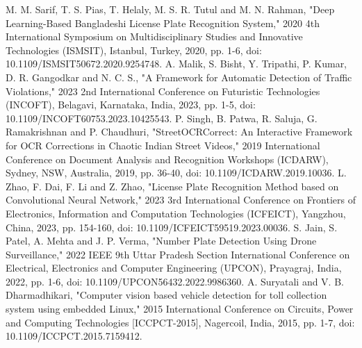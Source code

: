 \documentclass[conference]{IEEEtran}
\begin{document}
\begin{thebibliography}{00}
 M. M. Sarif, T. S. Pias, T. Helaly, M. S. R. Tutul and M. N. Rahman, "Deep Learning-Based Bangladeshi License Plate Recognition System," 2020 4th International Symposium on Multidisciplinary Studies and Innovative Technologies (ISMSIT), Istanbul, Turkey, 2020, pp. 1-6, doi: 10.1109/ISMSIT50672.2020.9254748.
 A. Malik, S. Bisht, Y. Tripathi, P. Kumar, D. R. Gangodkar and N. C. S., "A Framework for Automatic Detection of Traffic Violations," 2023 2nd International Conference on Futuristic Technologies (INCOFT), Belagavi, Karnataka, India, 2023, pp. 1-5, doi: 10.1109/INCOFT60753.2023.10425543.
 P. Singh, B. Patwa, R. Saluja, G. Ramakrishnan and P. Chaudhuri, "StreetOCRCorrect: An Interactive Framework for OCR Corrections in Chaotic Indian Street Videos," 2019 International Conference on Document Analysis and Recognition Workshops (ICDARW), Sydney, NSW, Australia, 2019, pp. 36-40, doi: 10.1109/ICDARW.2019.10036.
 L. Zhao, F. Dai, F. Li and Z. Zhao, "License Plate Recognition Method based on Convolutional Neural Network," 2023 3rd International Conference on Frontiers of Electronics, Information and Computation Technologies (ICFEICT), Yangzhou, China, 2023, pp. 154-160, doi: 10.1109/ICFEICT59519.2023.00036.
 S. Jain, S. Patel, A. Mehta and J. P. Verma, "Number Plate Detection Using Drone Surveillance," 2022 IEEE 9th Uttar Pradesh Section International Conference on Electrical, Electronics and Computer Engineering (UPCON), Prayagraj, India, 2022, pp. 1-6, doi: 10.1109/UPCON56432.2022.9986360.
 A. Suryatali and V. B. Dharmadhikari, "Computer vision based vehicle detection for toll collection system using embedded Linux," 2015 International Conference on Circuits, Power and Computing Technologies [ICCPCT-2015], Nagercoil, India, 2015, pp. 1-7, doi: 10.1109/ICCPCT.2015.7159412.
\end{thebibliography}
\end{document}
